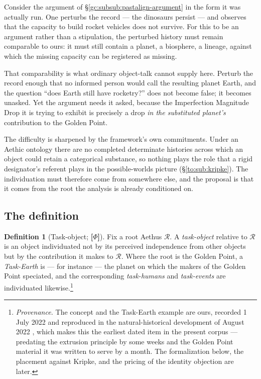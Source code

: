 \documentclass[11pt]{article}
\numberwithin{equation}{section}
\theoremstyle{plain}
\theoremstyle{definition}
\newtheorem{definition}[theorem]{Definition}
\theoremstyle{remark}
\begin{document}
Consider the argument of \S\ref{gc:subsub:pastalign-argument} in the
form it was actually run. One perturbs the record --- the dinosaurs
persist --- and observes that the capacity to build rocket vehicles does
not survive. For this to be an argument rather than a stipulation, the
perturbed history must remain comparable to ours: it must still contain
a planet, a biosphere, a lineage, against which the missing capacity can
be registered as missing.

That comparability is what ordinary object-talk cannot supply here.
Perturb the record enough that no informed person would call the
resulting planet Earth, and the question ``does Earth still have
rocketry?'' does not become false; it becomes unasked. Yet the argument
needs it asked, because the Imperfection Magnitude Drop it is trying to
exhibit is precisely a drop \emph{in the substituted planet's}
contribution to the Golden Point.

The difficulty is sharpened by the framework's own commitments. Under an
Aethic ontology there are no completed determinate histories across
which an object could retain a categorical substance, so nothing plays
the role that a rigid designator's referent plays in the possible-worlds
picture (\S\ref{to:sub:kripke}). The individuation must therefore come
from somewhere else, and the proposal is that it comes from the root the
analysis is already conditioned on.

\subsection{The definition}\label{to:sub:definition}

\begin{definition}[Task-object; \textbf{[$\Phi$]}]\label{to:def:taskobject}
Fix a root Aethus $\mathcal R$. A \emph{task-object} relative to
$\mathcal R$ is an object individuated not by its perceived independence
from other objects but by the contribution it makes to
$\mathcal R$. Where the root is the Golden Point, a \emph{Task-Earth} is
--- for instance --- the planet on which the makers of the Golden Point
speciated, and the corresponding \emph{task-humans} and
\emph{task-events} are individuated likewise.\footnote{%
\emph{Provenance.} The concept and the Task-Earth example are
ours, recorded 1 July 2022 and reproduced in the natural-historical
development of August 2022 \cite{GoldenScience22}, which makes this the
earliest dated item in the present corpus --- predating the extrusion
principle by some weeks and the Golden Point material it was written to
serve by a month. The formalization below, the placement against Kripke,
and the pricing of the identity objection are later.}
\end{definition}
\end{document}
